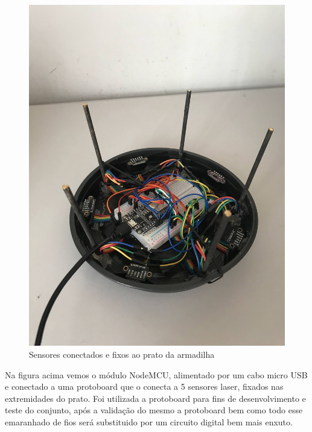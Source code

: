 \documentclass[
	12pt,				%
	openright,			%
	oneside,			%
	a4paper,			%
	chapter=TITLE,		%
	english,			%
	brazil				%
	]{abntex2}
\begin{document}
\begin{figure}[H]
    \centering
    \includegraphics[scale=0.09, angle=-90]{imagens/IMG_0606.jpg}
    \caption{Sensores conectados e fixos ao prato da armadilha}
    \label{fig:hardwareprato}
\end{figure}   

Na figura acima vemos o módulo NodeMCU, alimentado por um cabo micro USB e conectado a uma protoboard que o conecta a 5 sensores laser,
fixados nas extremidades do prato. Foi utilizada a protoboard para fins de desenvolvimento e teste do conjunto, após a validação do mesmo
a protoboard bem como todo esse emaranhado de fios será substituido por um circuito digital bem mais enxuto. 
\end{document}
